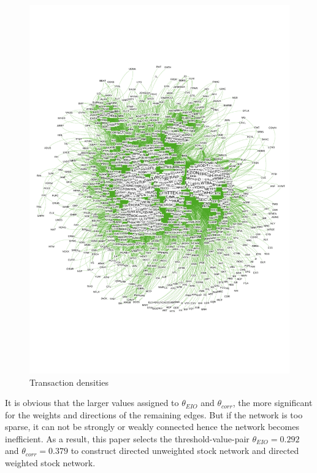 \begin{figure}
	\begin{center}
		\includegraphics[width=14cm]{Graph_01}
	\end{center}
	\caption{Transaction densities}
	\label{fig:Graph_01}
\end{figure}


It is obvious that the larger values assigned to $\theta_{EIO}$ and $\theta_{corr}$, the more significant for the weights and directions of the remaining edges. But if the network is too sparse, it can not be strongly or weakly connected hence the network becomes inefficient. As a result, this paper selects the threshold-value-pair $\theta_{EIO}=0.292$ and $\theta_{corr}=0.379$ to construct directed unweighted stock network and directed weighted stock network.


